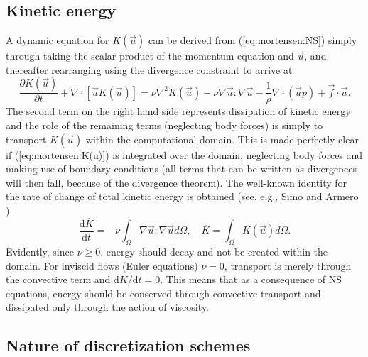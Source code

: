 \subsection{Kinetic energy}
\label{sec:mortensen:kinetic}
A dynamic equation for $K(\vec{u})$ can be derived from (\eqref{eq:mortensen:NS}) simply through taking the scalar product of the momentum equation and $\vec{u}$, and thereafter rearranging using the divergence constraint to arrive at
\begin{equation}
 \frac{\partial K(\vec{u})}{\partial t} + \nabla \cdot [\vec{u}K(\vec{u})] = \nu \nabla^2 K(\vec{u}) -\nu \nabla \vec{u} : \nabla \vec{u} - \frac{1}{\rho}\nabla \cdot \left(\vec{u}p \right) +\vec{f}\cdot \vec{u}. 
 \label{eq:mortensen:K(u)}
\end{equation}
The second term on the right hand side represents dissipation of kinetic energy and the role of the remaining terms (neglecting body forces) is simply to transport $K(\vec{u})$ within the computational domain. This is made perfectly clear if (\eqref{eq:mortensen:K(u)}) is integrated over the domain, neglecting body forces and making use of boundary conditions (all terms that can be written as divergences will then fall, because of the divergence theorem). The well-known identity for the rate of change of total kinetic energy is obtained (see, e.g., Simo and Armero \cite{SimoArmero1994})
\begin{equation}
 \frac{\text{d} \overline{K} }{\text{d} t} = - \nu \int_\Omega \nabla \vec{u} : \nabla \vec{u} d\Omega,
\quad \overline{K} = \int_{\Omega} K(\vec{u})d\Omega .
\end{equation}
Evidently, since $\nu \ge 0$, energy should decay and not be created within the domain. For inviscid flows (Euler equations) $\nu=0$, transport is merely through the convective term and $\text{d} \overline{K}/\text{d} t = 0$. This means that as a consequence of NS equations, energy should be conserved through convective transport and dissipated only through the action of viscosity.
\subsection{Nature of discretization schemes}
\label{sec:mortensen:dissipative:dispersive}

